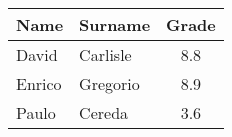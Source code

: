 \documentclass{article}
\begin{document}
	
	\begin{tabular}{llS}
		\hline
		Name & Surname & {Grade}\\
		\hline
		David & Carlisle & 8.8\\
		Enrico & Gregorio & 8.9\\
		Paulo & Cereda & 3.6\\
		\hline
	\end{tabular}
	
\end{document}
